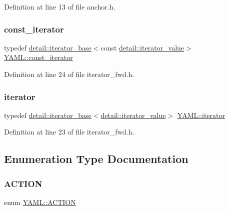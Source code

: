 Definition at line 13 of file anchor.\+h.

\mbox{\label{namespace_y_a_m_l_a0a1f3211b4b1f42bb8e6a9fde49b5c44}} 
\subsubsection{\texorpdfstring{const\_iterator}{const\_iterator}}
{\footnotesize\ttfamily typedef \mbox{\hyperlink{class_y_a_m_l_1_1detail_1_1iterator__base}{detail\+::iterator\+\_\+base}}$<$const \mbox{\hyperlink{struct_y_a_m_l_1_1detail_1_1iterator__value}{detail\+::iterator\+\_\+value}}$>$ \mbox{\hyperlink{namespace_y_a_m_l_a0a1f3211b4b1f42bb8e6a9fde49b5c44}{Y\+A\+M\+L\+::const\+\_\+iterator}}}



Definition at line 24 of file iterator\+\_\+fwd.\+h.

\mbox{\label{namespace_y_a_m_l_a057e57e7f23a1b85ea32bbc730b94d24}} 
\subsubsection{\texorpdfstring{iterator}{iterator}}
{\footnotesize\ttfamily typedef \mbox{\hyperlink{class_y_a_m_l_1_1detail_1_1iterator__base}{detail\+::iterator\+\_\+base}}$<$\mbox{\hyperlink{struct_y_a_m_l_1_1detail_1_1iterator__value}{detail\+::iterator\+\_\+value}}$>$ \mbox{\hyperlink{namespace_y_a_m_l_a057e57e7f23a1b85ea32bbc730b94d24}{Y\+A\+M\+L\+::iterator}}}



Definition at line 23 of file iterator\+\_\+fwd.\+h.



\subsection{Enumeration Type Documentation}
\mbox{\label{namespace_y_a_m_l_afebe2c8ae8d2681a7fe8a4a74793758b}} 
\subsubsection{\texorpdfstring{ACTION}{ACTION}}
{\footnotesize\ttfamily enum \mbox{\hyperlink{namespace_y_a_m_l_afebe2c8ae8d2681a7fe8a4a74793758b}{Y\+A\+M\+L\+::\+A\+C\+T\+I\+ON}}}

